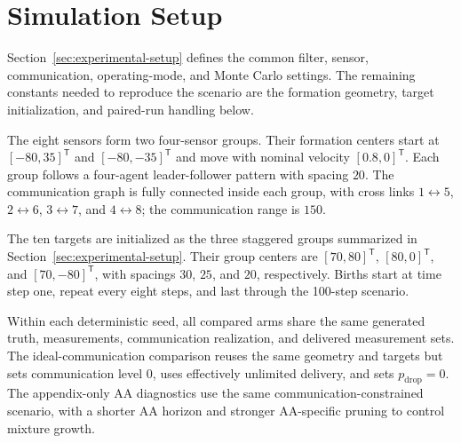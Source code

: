 \section{Simulation Setup}
\label{app:simulation-setup}

Section~\ref{sec:experimental-setup} defines the common filter, sensor, communication, operating-mode, and Monte Carlo settings. The remaining constants needed to reproduce the scenario are the formation geometry, target initialization, and paired-run handling below.

The eight sensors form two four-sensor groups. Their formation centers start at $[-80,35]^\mathsf{T}$ and $[-80,-35]^\mathsf{T}$ and move with nominal velocity $[0.8,0]^\mathsf{T}$. Each group follows a four-agent leader-follower pattern with spacing $20$. The communication graph is fully connected inside each group, with cross links $1\leftrightarrow5$, $2\leftrightarrow6$, $3\leftrightarrow7$, and $4\leftrightarrow8$; the communication range is $150$.

The ten targets are initialized as the three staggered groups summarized in Section~\ref{sec:experimental-setup}. Their group centers are $[70,80]^\mathsf{T}$, $[80,0]^\mathsf{T}$, and $[70,-80]^\mathsf{T}$, with spacings $30$, $25$, and $20$, respectively. Births start at time step one, repeat every eight steps, and last through the 100-step scenario.

Within each deterministic seed, all compared arms share the same generated truth, measurements, communication realization, and delivered measurement sets. The ideal-communication comparison reuses the same geometry and targets but sets communication level $0$, uses effectively unlimited delivery, and sets $p_{\mathrm{drop}}=0$. The appendix-only AA diagnostics use the same communication-constrained scenario, with a shorter AA horizon and stronger AA-specific pruning to control mixture growth.
